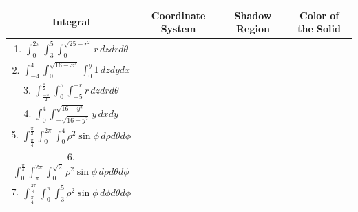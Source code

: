\documentclass[11pt]{article}
\begin{document}
\begin{center}
\begin{tabular}{|c|c|c|c|}
\hline
\textbf{Integral} & \textbf{Coordinate System} & \textbf{Shadow Region} & \textbf{Color of the Solid} \\
\hline
1. $\displaystyle \int_0^{2\pi} \int_3^5 \int_0^{\sqrt{25-r^2}} r \, dzdrd\theta $ & & & \\[20pt]
\hline
2. $\displaystyle \int_{-4}^4 \int_0^{\sqrt{16-x^2}}\int_0^y 1 \, dzdydx$ & & & \\[20pt]
\hline
3. $\displaystyle \int_{\frac{-\pi}{2}}^{\frac{\pi}{2}} \int_0^5 \int _{-5}^{-r} r \, dzdrd\theta$ & & & \\[20pt]
\hline
4. $\displaystyle \int_0^4 \int_{-\sqrt{16-y^2}}^{\sqrt{16-y^2}} y\, dxdy$ & & & \\[20pt]
\hline
5. $\displaystyle \int_{\frac{\pi}{4}}^{\frac{\pi}{2}} \int_0^{2\pi} \int _0^4 \rho^2 \sin \phi \, d\rho d\theta d\phi$  & & & \\[20pt]
\hline
6. $\displaystyle \int_0^{\frac{\pi}{4}} \int_{\pi}^{2\pi} \int_0^{\sqrt{2}} \rho^2 \sin \phi \, d\rho d\theta d\phi$ & & & \\[20pt]
\hline
7. $\displaystyle \int_{\frac{\pi}{4}}^{\frac{3\pi}{4}} \int_0^{\pi} \int_3^5 \rho^2 \sin \phi \, d\phi d\theta d\phi$ & & & \\[20pt]
\hline
\end{tabular}
\end{center}
\end{document}
